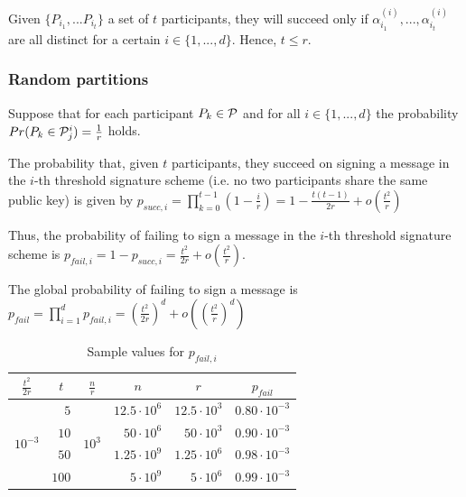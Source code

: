 Given $\{P_{i_1}, ... P_{i_t} \}$ a set of $t$ participants, they will succeed only if $\alpha^{(i)}_{i_1}, ..., \alpha^{(i)}_{i_t} $ are all distinct for a certain $i \in \{1, ...,d\}$. Hence, $t \leq r$.

\subsubsection*{Random partitions}
Suppose that for each participant $P_k \in {\mathcal P}$ and for all $i \in \{1, ..., d\}$ the probability $Pr(P_k \in {\mathcal P}^i_j) = \frac{1}{r}$ holds.

The probability that, given $t$ participants, they succeed on signing a message in the $i$-th threshold signature scheme (i.e. no two participants share the same public key) is given by $p_{succ,i} = \prod_{k=0}^{t-1} (1-\frac{i}{r}) = 1 - \frac{t(t-1)}{2r} + o\left( \frac{t^2}{r} \right)$

Thus, the probability of failing to sign a message in the $i$-th threshold signature scheme is $p_{fail,i} = 1 - p_{succ,i} = \frac{t^2}{2r} + o\left( \frac{t^2}{r} \right)$.

The global probability of failing to sign a message is $p_{fail} = \prod_{i=1}^d p_{fail,i} = {\left(\frac{t^2}{2r}\right)^d + o\left( \left( \frac{t^{2}}{r} \right)^d \right)}$

\begin{table}[H]
\begin{center}
    \begin{tabular}{|c|r|c|r|r|c|}
        \hline
        $\frac{t^2}{2r}$ & \multicolumn{1}{c|}{$t$} & $\frac{n}{r}$ & \multicolumn{1}{c|}{$n$} & \multicolumn{1}{c|}{$r$} & $p_{fail}$ \\ \hline
        
        \multirow{4}{*}{$10^{-3}$} & $5$ & \multirow{4}{*}{$10^{3}$} & $12.5 \cdot 10^6$ & $12.5 \cdot 10^{3}$ & $0.80 \cdot 10^{-3}$ \\ \cline{2-2} \cline{4-6}
        & $10$ & & $50 \cdot 10^6$ & $50 \cdot 10^{3}$ & $0.90 \cdot 10^{-3}$ \\ \cline{2-2} \cline{4-6}
        & $50$ & & $1.25 \cdot 10^9$ & $1.25 \cdot 10^{6}$ & $0.98 \cdot 10^{-3}$ \\ \cline{2-2} \cline{4-6}
        & $100$ & & $5 \cdot 10^9$ & $5 \cdot 10^{6}$ & $0.99 \cdot 10^{-3}$ \\ \cline{2-2} \cline{4-6}
        
        \hline

    \end{tabular}
\end{center}
\caption{Sample values for $p_{fail,i}$}
\end{table}


